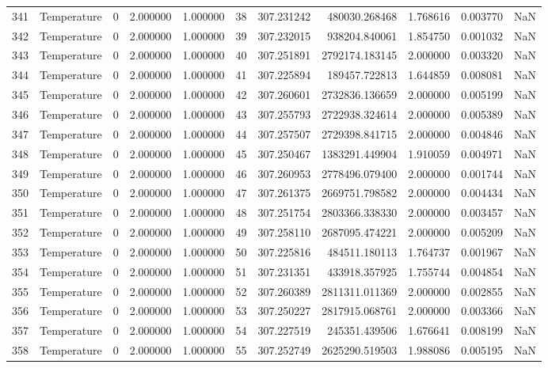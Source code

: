 \begin{tabular}{llrrrrrrrrr}
341 & Temperature & 0 & 2.000000 & 1.000000 & 38 & 307.231242 & 480030.268468 & 1.768616 & 0.003770 & NaN \\
342 & Temperature & 0 & 2.000000 & 1.000000 & 39 & 307.232015 & 938204.840061 & 1.854750 & 0.001032 & NaN \\
343 & Temperature & 0 & 2.000000 & 1.000000 & 40 & 307.251891 & 2792174.183145 & 2.000000 & 0.003320 & NaN \\
344 & Temperature & 0 & 2.000000 & 1.000000 & 41 & 307.225894 & 189457.722813 & 1.644859 & 0.008081 & NaN \\
345 & Temperature & 0 & 2.000000 & 1.000000 & 42 & 307.260601 & 2732836.136659 & 2.000000 & 0.005199 & NaN \\
346 & Temperature & 0 & 2.000000 & 1.000000 & 43 & 307.255793 & 2722938.324614 & 2.000000 & 0.005389 & NaN \\
347 & Temperature & 0 & 2.000000 & 1.000000 & 44 & 307.257507 & 2729398.841715 & 2.000000 & 0.004846 & NaN \\
348 & Temperature & 0 & 2.000000 & 1.000000 & 45 & 307.250467 & 1383291.449904 & 1.910059 & 0.004971 & NaN \\
349 & Temperature & 0 & 2.000000 & 1.000000 & 46 & 307.260953 & 2778496.079400 & 2.000000 & 0.001744 & NaN \\
350 & Temperature & 0 & 2.000000 & 1.000000 & 47 & 307.261375 & 2669751.798582 & 2.000000 & 0.004434 & NaN \\
351 & Temperature & 0 & 2.000000 & 1.000000 & 48 & 307.251754 & 2803366.338330 & 2.000000 & 0.003457 & NaN \\
352 & Temperature & 0 & 2.000000 & 1.000000 & 49 & 307.258110 & 2687095.474221 & 2.000000 & 0.005209 & NaN \\
353 & Temperature & 0 & 2.000000 & 1.000000 & 50 & 307.225816 & 484511.180113 & 1.764737 & 0.001967 & NaN \\
354 & Temperature & 0 & 2.000000 & 1.000000 & 51 & 307.231351 & 433918.357925 & 1.755744 & 0.004854 & NaN \\
355 & Temperature & 0 & 2.000000 & 1.000000 & 52 & 307.260389 & 2811311.011369 & 2.000000 & 0.002855 & NaN \\
356 & Temperature & 0 & 2.000000 & 1.000000 & 53 & 307.250227 & 2817915.068761 & 2.000000 & 0.003366 & NaN \\
357 & Temperature & 0 & 2.000000 & 1.000000 & 54 & 307.227519 & 245351.439506 & 1.676641 & 0.008199 & NaN \\
358 & Temperature & 0 & 2.000000 & 1.000000 & 55 & 307.252749 & 2625290.519503 & 1.988086 & 0.005195 & NaN \\

\end{tabular}
